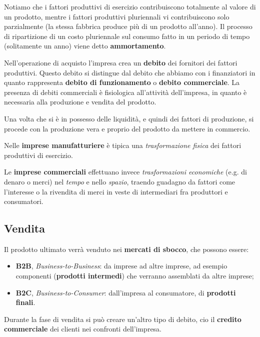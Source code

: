 \documentclass[a4paper,11pt]{article}
\begin{document}
Notiamo che i fattori produttivi di esercizio contribuiscono totalmente al valore di un prodotto, mentre i fattori produttivi pluriennali vi contribuiscono solo parzialmente (la stessa fabbrica produce più di un prodotto all'anno).
Il processo di ripartizione di un costo pluriennale sul consumo fatto in un periodo di tempo (solitamente un anno) viene detto \textbf{ammortamento}.

Nell'operazione di acquisto l'impresa crea un \textbf{debito} dei fornitori dei fattori produttivi.
Questo debito si distingue dal debito che abbiamo con i finanziatori in quanto rappresenta \textbf{debito di funzionamento} o \textbf{debito commerciale}.
La presenza di debiti commerciali è fisiologica all'attività dell'impresa, in quanto è necessaria alla produzione e vendita del prodotto.

\par\smallskip

Una volta che si è in possesso delle liquidità, e quindi dei fattori di produzione, si procede con la produzione vera e proprio del prodotto da mettere in commercio.

Nelle \textbf{imprese manufatturiere} è tipica una \textit{trasformazione fisica} dei fattori produttivi di esercizio.

Le \textbf{imprese commerciali} effettuano invece \textit{trasformazioni economiche} (e.g. di denaro o merci) nel \textit{tempo} e nello \textit{spazio}, traendo guadagno da fattori come l'interesse o la rivendita di merci in veste di intermediari fra produttori e consumatori.

\subsection{Vendita}
Il prodotto ultimato verrà venduto nei \textbf{mercati di sbocco}, che possono essere:
\begin{itemize}
	\item \textbf{B2B}, \textit{Business-to-Business}: da imprese ad altre imprese, ad esempio componenti (\textbf{prodotti intermedi}) che verranno assemblati da altre imprese;
	\item \textbf{B2C}, \textit{Business-to-Consumer}: dall'impresa al consumatore, di \textbf{prodotti finali}.
\end{itemize}

Durante la fase di vendita si può creare un'altro tipo di debito, cio il \textbf{credito commerciale} dei clienti nei confronti dell'impresa.
\end{document}
